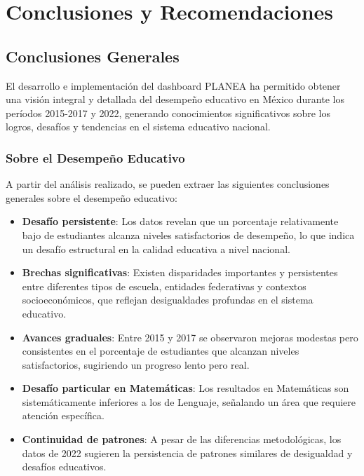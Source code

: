 \chapter{Conclusiones y Recomendaciones}

\section{Conclusiones Generales}
El desarrollo e implementación del dashboard PLANEA ha permitido obtener una visión integral y detallada del desempeño educativo en México durante los períodos 2015-2017 y 2022, generando conocimientos significativos sobre los logros, desafíos y tendencias en el sistema educativo nacional.

\subsection{Sobre el Desempeño Educativo}
A partir del análisis realizado, se pueden extraer las siguientes conclusiones generales sobre el desempeño educativo:

\begin{itemize}
    \item \textbf{Desafío persistente}: Los datos revelan que un porcentaje relativamente bajo de estudiantes alcanza niveles satisfactorios de desempeño, lo que indica un desafío estructural en la calidad educativa a nivel nacional.
    
    \item \textbf{Brechas significativas}: Existen disparidades importantes y persistentes entre diferentes tipos de escuela, entidades federativas y contextos socioeconómicos, que reflejan desigualdades profundas en el sistema educativo.
    
    \item \textbf{Avances graduales}: Entre 2015 y 2017 se observaron mejoras modestas pero consistentes en el porcentaje de estudiantes que alcanzan niveles satisfactorios, sugiriendo un progreso lento pero real.
    
    \item \textbf{Desafío particular en Matemáticas}: Los resultados en Matemáticas son sistemáticamente inferiores a los de Lenguaje, señalando un área que requiere atención específica.
    
    \item \textbf{Continuidad de patrones}: A pesar de las diferencias metodológicas, los datos de 2022 sugieren la persistencia de patrones similares de desigualdad y desafíos educativos.
\end{itemize}

